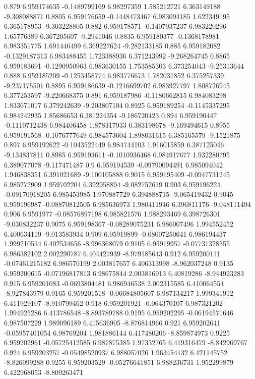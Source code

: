 {0.879 6.959174635 -0.1489799169 6.98297359 1.585212721 6.363149188 -9.308088871
0.8805 6.959176659 -0.1448473467 6.983094185 1.622349195 6.365178953 -9.303228805
0.882 6.959178571 -0.1407937237 6.983220296 1.65776389 6.367205607 -9.2941046
0.8835 6.959180377 -0.1368178981 6.983351775 1.691446499 6.369227624 -9.282133185
0.885 6.959182082 -0.1329187313 6.983488455 1.723388936 6.371243992 -9.268264745
0.8865 6.959183691 -0.1290950963 6.983630155 1.753585303 6.373254043 -9.25313644
0.888 6.959185209 -0.1253458774 6.983776673 1.782031852 6.375257339 -9.237175501
0.8895 6.959186639 -0.1216699702 6.983927797 1.808726945 6.377253597 -9.220668375
0.891 6.959187986 -0.1180662815 6.984083298 1.833671017 6.379242639 -9.203807104
0.8925 6.959189254 -0.1145337295 6.984242935 1.85686653 6.381224354 -9.186720423
0.894 6.959190447 -0.1110712438 6.984406458 1.878317933 6.383198678 -9.169494615
0.8955 6.959191568 -0.1076777649 6.984573604 1.898031615 6.385165579 -9.1521875
0.897 6.959192622 -0.1043522449 6.984744103 1.916015859 6.387125046 -9.134837811
0.8985 6.959193611 -0.1010936468 6.984917677 1.932280795 6.389077078 -9.117471487
0.9 6.959194539 -0.09790094491 6.985094042 1.946838351 6.391021689 -9.100105888
0.9015 6.959195409 -0.0947731245 6.985272909 1.959702204 6.392958894 -9.082752619
0.903 6.959196224 -0.09170918205 6.985453985 1.970887729 6.394888715 -9.065419432
0.9045 6.959196987 -0.08870812505 6.985636973 1.980411946 6.396811176 -9.048111494
0.906 6.9591977 -0.08576897198 6.985821576 1.988293469 6.398726301 -9.030832237
0.9075 6.959198367 -0.08289075231 6.986007496 1.994552452 6.400634119 -9.013583934
0.909 6.95919899 -0.08007250641 6.986194437 1.999210534 6.402534656 -8.996368079
0.9105 6.95919957 -0.07731328555 6.986382102 2.002290787 6.404427939 -8.979185643
0.912 6.959200111 -0.07461215182 6.986570199 2.003817657 6.406313998 -8.962037248
0.9135 6.959200615 -0.07196817813 6.98675844 2.003816913 6.40819286 -8.944923283
0.915 6.959201083 -0.0693804481 6.986946538 2.002315585 6.410064554 -8.927843979
0.9165 6.959201518 -0.06684805607 6.987134217 1.999341912 6.411929107 -8.910799462
0.918 6.959201921 -0.064370107 6.987321202 1.994925286 6.413786548 -8.893789788
0.9195 6.959202295 -0.06194571646 6.987507229 1.989096189 6.415636905 -8.876814966
0.921 6.959202641 -0.05957401054 6.98769204 1.981886144 6.417480206 -8.859874973
0.9225 6.959202961 -0.05725412585 6.987875385 1.97332765 6.419316479 -8.842969767
0.924 6.959203257 -0.05498520937 6.988057026 1.963454132 6.421145752 -8.826099288
0.9255 6.959203529 -0.05276641851 6.988236731 1.952299879 6.422968053 -8.809263471
}
